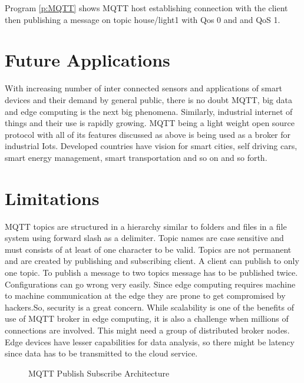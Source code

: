 \documentclass[sigconf]{acmart}
\begin{document}
Program \ref{p:MQTT} shows MQTT host establishing connection with the client then publishing a message on topic house/light1 with Qos 0 and and QoS 1.



\section{Future Applications}
With increasing number of inter connected sensors and applications of smart devices and their demand by general public, there is no doubt MQTT, big data and edge computing is the next big phenomena. Similarly, industrial internet of things and their use is rapidly growing. MQTT being a light weight open source protocol with all of its features discussed as above is being used as a broker for industrial Iots. Developed countries have vision for smart cities, self driving cars, smart energy management, smart transportation  and so on and so forth.    





\section{Limitations}

MQTT topics are structured in a hierarchy similar to folders and files in a file system using forward slash as a delimiter. Topic names are case sensitive and must consists of at least of one character to be valid.
Topics are not permanent and are created by publishing and subscribing client.
A client can publish to only one topic.
To publish a message to two topics message has to be published twice.
Configurations can go wrong very easily. Since edge computing requires machine to machine communication at the edge they are prone to get compromised by hackers.So, security is a great concern. While scalability is one of the benefits of use of MQTT broker in edge computing, it is also a challenge when millions of connections are involved. This might need a group of distributed broker nodes. Edge devices have lesser capabilities for data analysis, so there might be latency since data has to be transmitted to the cloud service. 


\begin{figure}[htb]
\caption{MQTT Publish Subscribe Architecture}




\end{figure}
\end{document}
